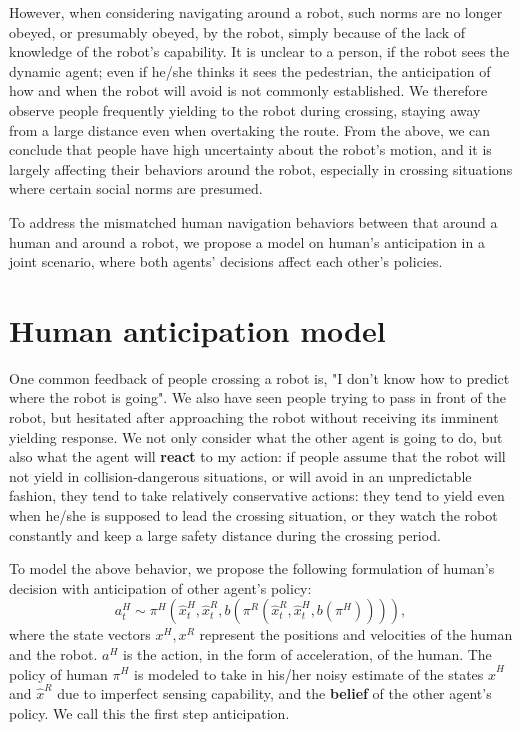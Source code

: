 \documentclass{article}
\begin{document}
However, when considering navigating around a robot, such norms are no longer obeyed, or presumably obeyed, by the robot, simply because of the lack of knowledge of the robot's capability. It is unclear to a person, if the robot sees the dynamic agent; even if he/she thinks it sees the pedestrian, the anticipation of how and when the robot will avoid is not commonly established. We therefore observe people frequently yielding to the robot during crossing, staying away from a large distance even when overtaking the route. From the above, we can conclude that people have high uncertainty about the robot's motion, and it is largely affecting their behaviors around the robot, especially in crossing situations where certain social norms are presumed.

To address the mismatched human navigation behaviors between that around a human and around a robot, we propose a model on human's anticipation in a joint scenario, where both agents' decisions affect each other's policies. 

\section{Human anticipation model}
One common feedback of people crossing a robot is, "I don't know how to predict where the robot is going". We also have seen people trying to pass in front of the robot, but hesitated after approaching the robot without receiving its imminent yielding response. We not only consider what the other agent is going to do, but also what the agent will \textbf{react} to my action: if people assume that the robot will not yield in collision-dangerous situations, or will avoid in an unpredictable fashion, they tend to take relatively conservative actions: they tend to yield even when he/she is supposed to lead the crossing situation, or they watch the robot constantly and keep a large safety distance during the crossing period.  

To model the above behavior, we propose the following formulation of human's decision with anticipation of other agent's policy:
\begin{equation}
a^H_t \sim \pi^H (\hat{x}^H_t, \hat{x}^R_t, b(\pi^R (\hat{x}^R_t, \hat{x}^H_t,b(\pi^H) ))) ,
\end{equation}
where the state vectors $x^H, x^R$ represent the positions and velocities of the human and the robot. $a^H$ is the action, in the form of acceleration, of the human. The policy of human $\pi^H$ is modeled to take in his/her noisy estimate of the states $\hat{x}^H$ and $\hat{x}^R$ due to imperfect sensing capability, and the \textbf{belief} of the other agent's policy. We call this the first step anticipation. 
\end{document}
